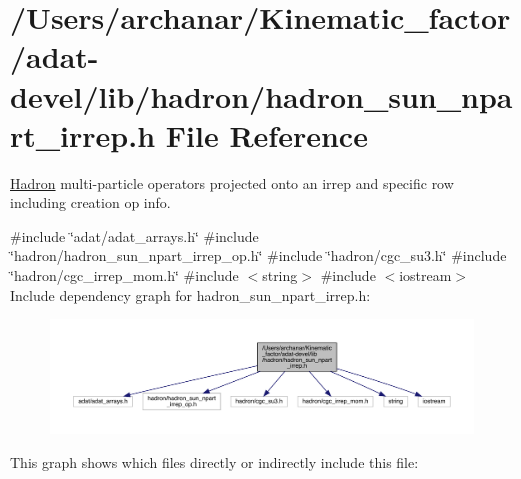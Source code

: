 \hypertarget{adat-devel_2lib_2hadron_2hadron__sun__npart__irrep_8h}{}\section{/\+Users/archanar/\+Kinematic\+\_\+factor/adat-\/devel/lib/hadron/hadron\+\_\+sun\+\_\+npart\+\_\+irrep.h File Reference}
\label{adat-devel_2lib_2hadron_2hadron__sun__npart__irrep_8h}


\mbox{\hyperlink{namespaceHadron}{Hadron}} multi-\/particle operators projected onto an irrep and specific row including creation op info.  


{\ttfamily \#include \char`\"{}adat/adat\+\_\+arrays.\+h\char`\"{}}\newline
{\ttfamily \#include \char`\"{}hadron/hadron\+\_\+sun\+\_\+npart\+\_\+irrep\+\_\+op.\+h\char`\"{}}\newline
{\ttfamily \#include \char`\"{}hadron/cgc\+\_\+su3.\+h\char`\"{}}\newline
{\ttfamily \#include \char`\"{}hadron/cgc\+\_\+irrep\+\_\+mom.\+h\char`\"{}}\newline
{\ttfamily \#include $<$string$>$}\newline
{\ttfamily \#include $<$iostream$>$}\newline
Include dependency graph for hadron\+\_\+sun\+\_\+npart\+\_\+irrep.\+h\+:
\nopagebreak
\begin{figure}[H]
\begin{center}
\leavevmode
\includegraphics[width=350pt]{da/d8d/adat-devel_2lib_2hadron_2hadron__sun__npart__irrep_8h__incl}
\end{center}
\end{figure}
This graph shows which files directly or indirectly include this file\+:
\nopagebreak
